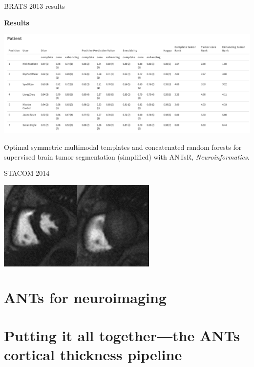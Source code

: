 \documentclass[ignorenonframetext,]{beamer}
\begin{document}
\begin{frame}{BRATS 2013 results}

{\textbf{Results}}

\includegraphics{./competitions/figures/brats2013results2.png}

Optimal symmetric multimodal templates and concatenated random forests
for supervised brain tumor segmentation (simplified) with ANTsR,
\emph{Neuroinformatics}.

\end{frame}

\begin{frame}{STACOM 2014}

\includegraphics{./competitions/figures/image_gallery.jpg}

\end{frame}

\section{ANTs for neuroimaging}\label{ants-for-neuroimaging}

\section{Putting it all together---the ANTs cortical thickness
pipeline}\label{putting-it-all-togetherthe-ants-cortical-thickness-pipeline}
\end{document}
